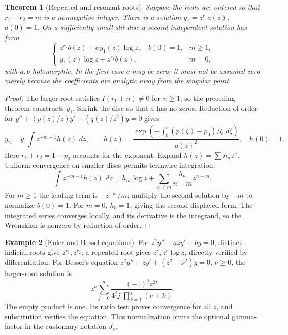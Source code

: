 \documentclass[11pt,oneside]{book}
\newtheorem{theorem}{Theorem}[chapter]
\theoremstyle{definition}
\newtheorem{example}[theorem]{Example}
\theoremstyle{remark}\newtheorem{remark}[theorem]{Remark}
\newcommand{\dd}{\,d}\newcommand{\id}{\operatorname{id}}
\begin{document}
\begin{theorem}[Repeated and resonant roots]\label{d13:09:resonance}
Suppose the roots are ordered so that \(r_1-r_2=m\) is a nonnegative
integer. There is a solution \(y_1=z^{r_1}a(z)\), \(a(0)=1\).
On a sufficiently small slit disc a second independent solution has form
\[
 \begin{cases}
 z^{r_2}b(z)+c\,y_1(z)\log z,\quad b(0)=1, & m\ge1,\\
 y_1(z)\log z+z^{r_1}b(z), &m=0,
 \end{cases}
\]
with \(a,b\) holomorphic. In the first case \(c\) may be zero; it must
not be assumed zero merely because the coefficients are analytic away
from the singular point.
\end{theorem}
\begin{proof}
The larger root satisfies \(I(r_1+n)\ne0\) for \(n\ge1\), so the preceding
theorem constructs \(y_1\). Shrink the disc so that \(a\) has no zeros.
Reduction of order for \(y''+(p(z)/z)y'+(q(z)/z^2)y=0\) gives
\[
 y_2=y_1\int z^{-m-1}h(z)\,\dd z,\qquad
 h(z)=\frac{\exp(-\int_0^z(p(\zeta)-p_0)/\zeta\,\dd\zeta)}{a(z)^2},
 \quad h(0)=1.
\]
Here \(r_1+r_2=1-p_0\) accounts for the exponent. Expand
\(h(z)=\sum h_nz^n\). Uniform convergence on smaller discs permits
termwise integration:
\[
 \int z^{-m-1}h(z)\,\dd z
 =h_m\log z+\sum_{n\ne m}\frac{h_n}{n-m}z^{n-m}.
\]
For \(m\ge1\) the leading term is \(-z^{-m}/m\); multiply the second
solution by \(-m\) to normalize \(b(0)=1\).
For \(m=0\), \(h_0=1\), giving the second displayed form.
The integrated series converges locally, and its derivative is the
integrand, so the Wronskian is nonzero by reduction of order.
\end{proof}

\begin{example}[Euler and Bessel equations]\label{d13:09:singular-examples}
For \(z^2y''+azy'+by=0\), distinct indicial roots give \(z^{r_1},z^{r_2}\);
a repeated root gives \(z^r,z^r\log z\), directly verified by
differentiation. For Bessel's equation
\(z^2y''+zy'+(z^2-\nu^2)y=0\), \(\nu\ge0\), the larger-root solution is
\[
 z^\nu\sum_{j=0}^\infty
 \frac{(-1)^j z^{2j}}{4^j j!\prod_{k=1}^j(\nu+k)} .
\]
The empty product is one. Its ratio test proves convergence for all
\(z\), and substitution verifies the equation. This normalization omits
the optional gamma-factor in the customary notation \(J_\nu\).
\end{example}
\end{document}
